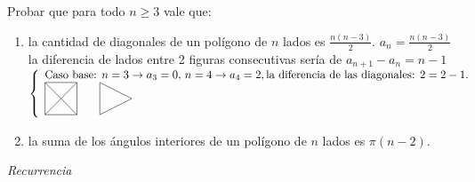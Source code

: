 \documentclass[12pt,a4paper, spanish]{article}
\begin{document}
\ejercicio
Probar que para todo $n \geq 3$ vale que:
\begin{enumerate}[label=\roman*)]
	\item la cantidad de diagonales de un polígono de $n$ lados es $\frac{n(n-3)}{2}$.
	      $a_n = \frac{n(n-3)}{2}$ la diferencia de lados entre 2 figuras consecutivas sería de $a_{n+1} - a_{n} = n - 1$\\
	      $\llave{ l }{
			      \text{Caso base: } n = 3 \to a_3 = 0,\, n = 4 \to a_4 = 2, \text{la diferencia de las diagonales: } 2 = 2 - 1.\\
			      \begin{tikzpicture}[scale=0.5]
				      \draw (0,0) -- (2,0) -- (2,2) -- (0,2) -- cycle;
				      \draw (0,0) -- (2,2);
				      \draw (0,2) -- (2,0);
			      \end{tikzpicture}
\qquad
			      \begin{tikzpicture}[scale=0.5]
				      \draw (2,0) -- (4,1) -- (2,2) -- cycle;
			      \end{tikzpicture}
		      }$\\

	\item la suma de los ángulos interiores de un polígono de $n$ lados es $\pi(n-2)$.
\end{enumerate}

\separador

\textit{Recurrencia}


\ejercicio

\ejercicio

\ejercicio
\end{document}
